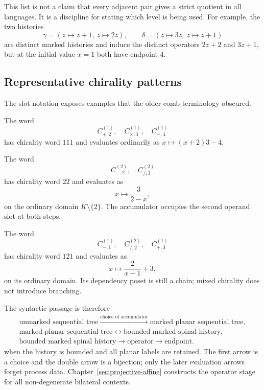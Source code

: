 This list is not a claim that every adjacent pair gives a strict quotient in
all languages.  It is a discipline for stating which level is being used.
For example, the two histories
\[
  \gamma=(z\mapsto z+1,\ z\mapsto2z),
  \qquad
  \delta=(z\mapsto3z,\ z\mapsto z+1)
\]
are distinct marked histories and induce the distinct operators $2z+2$ and
$3z+1$, but at the initial value $x=1$ both have endpoint $4$.

\subsection{Representative chirality patterns}

The slot notation exposes examples that the older comb terminology obscured.

\begin{example}
The word
\[
  C_{+,2}^{(1)},\quad C_{\times,3}^{(1)},\quad C_{-,4}^{(1)}
\]
has chirality word $111$ and evaluates ordinarily as
$x\mapsto (x+2)3-4$.
\end{example}

\begin{example}
The word
\[
  C_{-,2}^{(2)},\quad C_{/,3}^{(2)}
\]
has chirality word $22$ and evaluates as
\[
  x\longmapsto \frac{3}{2-x},
\]
on the ordinary domain $K\setminus\{2\}$.  The accumulator occupies the
second operand slot at both steps.
\end{example}

\begin{example}
The word
\[
  C_{-,1}^{(1)},\quad C_{/,2}^{(2)},\quad C_{+,3}^{(1)}
\]
has chirality word $121$ and evaluates as
\[
  x\longmapsto \frac{2}{x-1}+3,
\]
on its ordinary domain.  Its dependency poset is still a chain; mixed
chirality does not introduce branching.
\end{example}

The syntactic passage is therefore
\[
  \begin{gathered}
    \text{unmarked sequential tree}
    \xrightarrow{\text{choice of accumulator}}
    \text{marked planar sequential tree},\\
    \text{marked planar sequential tree}
    \longleftrightarrow
    \text{bounded marked spinal history},\\
    \text{bounded marked spinal history}
    \longrightarrow
    \text{operator}
    \longrightarrow
    \text{endpoint}.
  \end{gathered}
\]
when the history is bounded and all planar labels are retained.  The first arrow is a
choice and the double arrow is a bijection; only the later evaluation arrows forget
process data.  Chapter~\ref{sec:projective-affine}
constructs the operator stage for all non-degenerate bilateral contexts.

